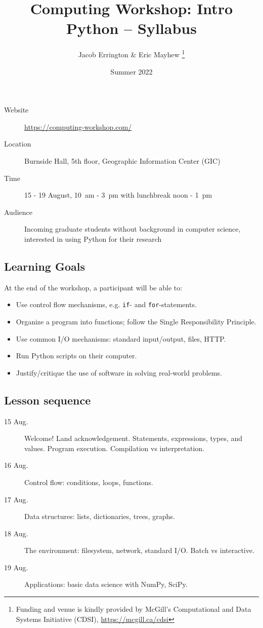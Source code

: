 \documentclass[11pt]{article}
\author{%
  Jacob Errington \& Eric Mayhew%
  \footnote{%
  Funding and venue is kindly provided by McGill's Computational and Data Systems Initiative (CDSI), \url{https://mcgill.ca/cdsi}
  }
}
\title{\vspace{-2em}Computing Workshop: Intro Python -- Syllabus}
\date{Summer 2022}
\begin{document}
\maketitle

\begin{multicols}{2}
  \begin{description}
    \item[Website]
      \url{https://computing-workshop.com/}
    \item[Location]
      Burnside Hall, 5th floor, Geographic Information Center (GIC)
    \item[Time]
      15 - 19 August, 10~am - 3~pm with lunchbreak noon - 1~pm
    \item[Audience]
      Incoming graduate students without background in computer science,
      interested in using Python for their research
  \end{description}

  \subsection*{Learning Goals}

  At the end of the workshop, a participant will be able to:

  \begin{itemize}
  \item Use control flow mechanisms, e.g. \lstinline!if!- and \lstinline!for!-statements.
  \item Organize a program into functions; follow the Single Responsibility Principle.
  \item Use common I/O mechanisms: standard input/output, files, HTTP.
  \item Run Python scripts on their computer.
  \item Justify/critique the use of software in solving real-world problems.
  \end{itemize}

  \subsection*{Lesson sequence}

  \begin{description}
  \item[15 Aug.] Welcome! Land acknowledgement. Statements, expressions, types,
    and values. Program execution. Compilation vs interpretation.
  \item[16 Aug.] Control flow: conditions, loops, functions.
  \item[17 Aug.] Data structures: lists, dictionaries, trees, graphs.
  \item[18 Aug.] The environment: filesystem, network, standard I/O. Batch vs interactive.
  \item[19 Aug.] Applications: basic data science with NumPy, SciPy.
  \end{description}


\end{multicols}
\end{document}
